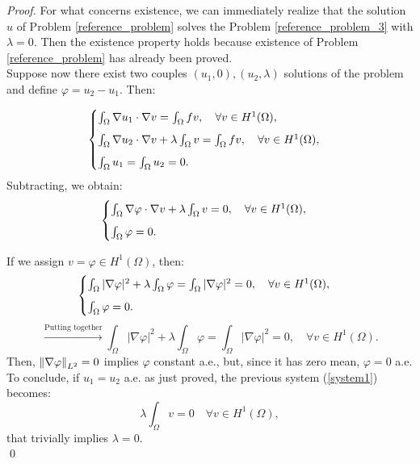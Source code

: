 \documentclass[a4paper,11pt]{article}
\begin{document}
\begin{proof}
	For what concerns existence, we can immediately realize that the solution $u$ of Problem \ref{reference_problem} solves the Problem \ref{reference_problem_3} with $\lambda=0$. Then the existence property holds because existence of Problem \ref{reference_problem} has already been proved. \\
	
	\noindent Suppose now there exist two couples $(u_1,0), (u_2,\lambda)$ solutions of the problem and define $\varphi=u_2-u_1$. Then:
	
	\begin{equation*}
	\begin{cases}
	\int_{\Omega}\nabla u_1 \cdot \nabla v = \int_{\Omega} fv, \quad \forall v \in H^1(\Omega),\vspace{2mm} \\
	\int_{\Omega}\nabla u_2 \cdot \nabla v + \lambda \int_\Omega v = \int_{\Omega} fv, \quad \forall v \in H^1(\Omega), \vspace{2mm}\\
	\int_{\Omega}u_1 = \int_{\Omega}u_2 = 0.
	\end{cases}
	\end{equation*}
		Subtracting, we obtain:
	\begin{equation}\label{system1}
	\begin{cases}
	\int_{\Omega}\nabla \varphi \cdot \nabla v + \lambda \int_\Omega v = 0, \quad \forall v \in H^1(\Omega),\vspace{2mm} \\
	\int_{\Omega}\varphi = 0.
	\end{cases}
	\end{equation}
	
	\noindent If we assign $v=\varphi \in H^1(\Omega)$, then:
	\begin{equation*}
	\begin{cases}
	\int_{\Omega}|\nabla \varphi|^2 + \lambda \int_\Omega \varphi = \int_{\Omega}|\nabla \varphi|^2 = 0, \quad \forall v \in H^1(\Omega),\vspace{2mm} \\
	\int_{\Omega}\varphi = 0.
	\end{cases}
	\end{equation*}
	\begin{equation*}
	\xrightarrow[]{\text{Putting together}} \int_{\Omega}|\nabla \varphi|^2 + \lambda \int_\Omega \varphi = \int_{\Omega}|\nabla \varphi|^2 = 0, \quad \forall v \in H^1(\Omega).
	\end{equation*}
	Then, $\norm{\nabla \varphi}_{L^2} = 0 $ implies $\varphi$ constant a.e., but, since it has zero mean,  $\varphi = 0$ a.e.  \\
	To conclude, if $u_1=u_2$ a.e. as just proved, the previous system (\ref{system1}) becomes:
	\begin{equation*}
	\lambda \int_{\Omega}v = 0 \quad \forall v \in H^1(\Omega),
	\end{equation*}
	that trivially implies $\lambda=0$.	\\ \qed
\end{proof}
	
\end{document}
